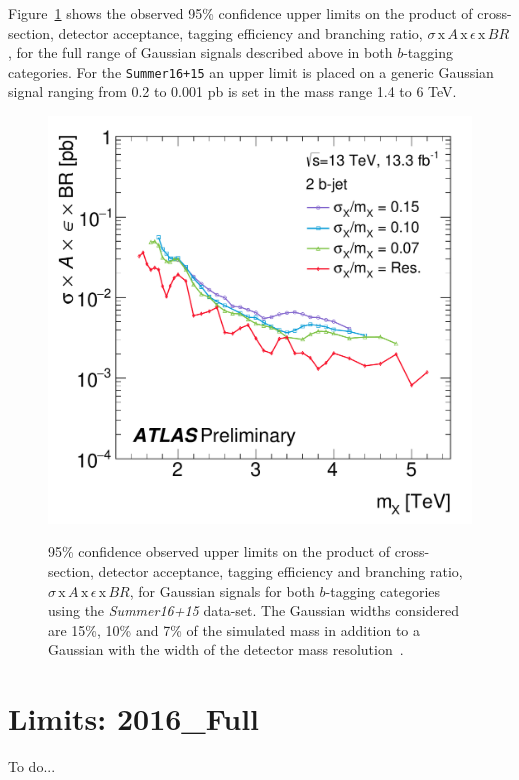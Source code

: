 Figure~\ref{fig:lim-summer_gauss} shows the observed 95\% confidence upper limits
on the product of cross-section, detector acceptance, tagging efficiency and branching ratio,
$\sigma\,\text{x}\,\mathit{A}\,\text{x}\,\epsilon\,\text{x}\,\mathit{BR}$,
for the full range of Gaussian signals described above in both $b$-tagging categories.
For the \verb|Summer16+15| an upper limit is placed on a generic Gaussian signal
ranging from 0.2 to 0.001 pb is set in the mass range 1.4 to 6 TeV.

\begin{figure}[!ht]
  \begin{center}
    \captionsetup[subfigure]{aboveskip=0pt,justification=centering}
         {\includegraphics[width=0.47\linewidth, angle=0]{figs/Dibjet/ICHEP/lim-summer_gauss_bb.pdf}}
  \end{center}
  \caption[95\% confidence observed upper limits
    on the product of cross-section, detector acceptance, tagging efficiency and branching ratio,
    $\sigma\,\text{x}\,\mathit{A}\,\text{x}\,\epsilon\,\text{x}\,\mathit{BR}$,
    for Gaussian signals for both $b$-tagging categories using the \textit{Summer16+15} data-set.
    The Gaussian widths considered are 15\%, 10\% and 7\% of the simulated mass
    in addition to a Gaussian with the width of the detector mass resolution.]
  {95\% confidence observed upper limits
    on the product of cross-section, detector acceptance, tagging efficiency and branching ratio,
    $\sigma\,\text{x}\,\mathit{A}\,\text{x}\,\epsilon\,\text{x}\,\mathit{BR}$,
    for Gaussian signals for both $b$-tagging categories using the \textit{Summer16+15} data-set.
    The Gaussian widths considered are 15\%, 10\% and 7\% of the simulated mass
    in addition to a Gaussian with the width of the detector mass resolution~\cite{dibjet-ichep_conf}.
  }
  \label{fig:lim-summer_gauss}
\end{figure}

\FloatBarrier

\section{Limits: 2016\_Full}
\label{sec:lim-full}

To do... 
